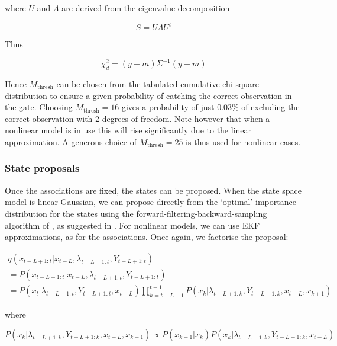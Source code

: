 where $U$ and $\Lambda$ are derived from the eigenvalue decomposition

\begin{equation}
S = U \Lambda U^t
\end{equation}

Thus

\begin{equation}
\chi_d^2 = (y-m) \Sigma^{-1} (y-m)
\end{equation}

Hence $M_{\text{thresh}}$ can be chosen from the tabulated cumulative chi-square distribution to ensure a given probability of catching the correct observation in the gate. Choosing $M_{\text{thresh}}=16$ gives a probability of just 0.03\% of excluding the correct observation with 2 degrees of freedom. Note however that when a nonlinear model is in use this will rise significantly due to the linear approximation. A generous choice of $M_{\text{thresh}}=25$ is thus used for nonlinear cases.



\subsubsection{State proposals}

Once the associations are fixed, the states can be proposed. When the state space model is linear-Gaussian, we can propose directly from the `optimal' importance distribution for the states using the forward-filtering-backward-sampling algorithm of \cite{Chib1996}, as suggested in \cite{Doucet2006}. For nonlinear models, we can use EKF approximations, as for the associations. Once again, we factorise the proposal:

\begin{multline}
q(x_{t-L+1:t}|x_{t-L}, \lambda_{t-L+1:t}, Y_{t-L+1:t}) \\
= P(x_{t-L+1:t}|x_{t-L}, \lambda_{t-L+1:t}, Y_{t-L+1:t}) \\
= P(x_t|\lambda_{t-L+1:t}, Y_{t-L+1:t}, x_{t-L}) \prod_{k=t-L+1}^{t-1} P(x_k|\lambda_{t-L+1:k}, Y_{t-L+1:k}, x_{t-L}, x_{k+1})
\label{eq:}
\end{multline}

where

\begin{equation}
P(x_k|\lambda_{t-L+1:k}, Y_{t-L+1:k}, x_{t-L}, x_{k+1}) \propto P(x_{k+1}|x_k) P(x_k|\lambda_{t-L+1:k}, Y_{t-L+1:k}, x_{t-L})
\label{eq:}
\end{equation}

